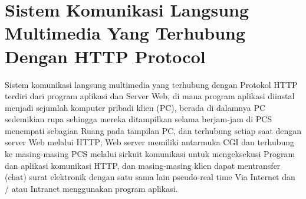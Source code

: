 \section{Sistem Komunikasi Langsung Multimedia Yang Terhubung Dengan HTTP Protocol}
Sistem komunikasi langsung multimedia yang terhubung dengan Protokol HTTP terdiri dari program aplikasi dan Server Web, di mana program aplikasi diinstal menjadi sejumlah komputer pribadi klien (PC), berada di dalamnya PC sedemikian rupa sehingga mereka ditampilkan selama berjam-jam di PCS menempati sebagian Ruang pada tampilan PC, dan terhubung setiap saat dengan server Web melalui HTTP; Web server memiliki antarmuka CGI dan terhubung ke masing-masing PCS melalui sirkuit komunikasi untuk mengeksekusi Program dan aplikasi komunikasi HTTP, dan masing-masing klien dapat mentransfer (chat) surat elektronik dengan satu sama lain pseudo-real time Via Internet dan / atau Intranet menggunakan program aplikasi\citep{nishizawa2005multimedia}.